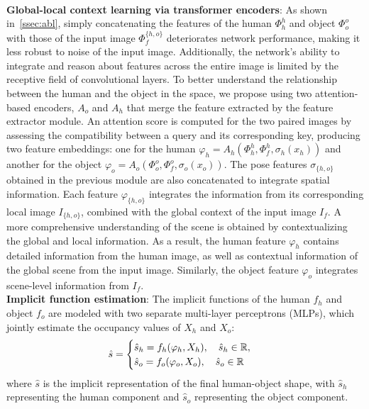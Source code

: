 \\\textbf{Global-local context learning via transformer encoders}: As shown in~\cref{ssec:abl}, simply concatenating the features of the human $\Phi_h^h$ and object $\Phi_o^o$ with those of the input image $\Phi_f^{\{h,o\}}$ deteriorates network performance, making it less robust to noise of the input image. Additionally, the network's ability to integrate and reason about features across the entire image is limited by the receptive field of convolutional layers.  To better understand the relationship between the human and the object in the space, we propose using two attention-based encoders, $A_o$ and $A_h$ that merge the feature extracted by the feature extractor module. An attention score is computed for the two paired images by assessing the compatibility between a query and its corresponding key, producing two feature embeddings:  one for the human $\varphi_h=A_h(\Phi_h^h,\Phi_f^h,\sigma_h(x_h))$ and another for the object $\varphi_o=A_o(\Phi_o^o,\Phi_f^o,\sigma_o(x_o))$. The pose features $\sigma_{\{h,o\}}$ obtained in the previous module are also concatenated to integrate spatial information. Each feature $\varphi_{\{h,o\}}$ integrates the information from its corresponding local image $I_{\{h,o\}}$, combined with the global context of the input image $I_f$. A more comprehensive understanding of the scene is obtained by contextualizing the global and local information. As a result, the human feature $\varphi_{h}$ contains detailed information from the human image, as well as contextual information of the global scene from the input image. Similarly, the object feature $\varphi_{o}$ integrates scene-level information from $I_f$.
%
\\\textbf{Implicit function estimation}: The implicit functions of the human $f_h$ and object $f_o$ are modeled with two separate multi-layer perceptrons (MLPs), which jointly estimate the occupancy values of  $X_h$ and $X_o$:
\vspace{-0.2cm}
\begin{equation}
    \begin{aligned}
\hat{s} = \begin{cases} \hat{s}_h=f_h(\varphi_h, X_h), \quad \hat{s}_h \in \mathbb{R},  \\ \hat{s}_o=f_o(\varphi_o, X_o), \quad \hat{s}_o \in \mathbb{R} \end{cases}
\end{aligned}
\vspace{-0.2cm}
\end{equation}
where $\hat{s}$ is the implicit representation of the final human-object shape, with $\hat{s}_h$ representing the human component and $\hat{s}_o$ representing the object component.
